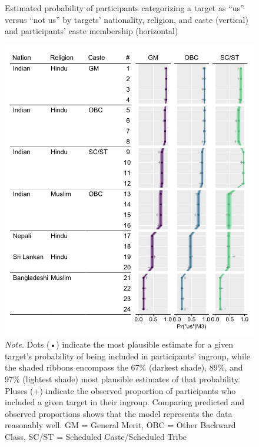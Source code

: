\documentclass[12pt, a4paper]{article}
\begin{document}
\begin{figure}
\caption{Estimated probability of participants categorizing a target as “us” versus “not us” by targets’ nationality, religion, and caste (vertical) and participants’ caste membership (horizontal)}
\centering
\includegraphics[scale=1]{../figures/figure-3}
\caption*{\textit{Note.} Dots (•) indicate the most plausible estimate for a given target’s probability of being included in participants’ ingroup, while the shaded ribbons encompass the 67\% (darkest shade), 89\%, and 97\% (lightest shade) most plausible estimates of that probability. Pluses (+) indicate the observed proportion of participants who included a given target in their ingroup. Comparing predicted and observed proportions shows that the model represents the data reasonably well. GM = General Merit, OBC = Other Backward Class, SC/ST = Scheduled Caste/Scheduled Tribe}
\label{fig:f3}
\end{figure}
\end{document}
